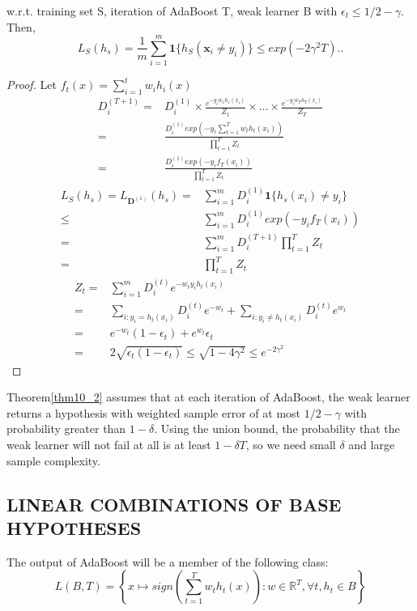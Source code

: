 \begin{thm}
	\label{thm10_2}
	w.r.t. training set S, iteration of AdaBoost T, weak learner B with $\epsilon_t \le 1/2 - \gamma$. Then,
	\[
		L_S(h_s) = \frac{1}{m} \sum\limits^m_{i=1}
		\mathbf{1} \{ h_S(\mathbf{x}_i \ne y_i) \}
		\le exp(-2 \gamma^2 T).
	.\]
\end{thm}
\begin{proof}
	Let $f_t(x) = \sum\limits^t_{i=1} w_i h_i (x)$
	\begin{align*}
		D^{(T+1)}_{i} =& D^{(1)}_{i} \times \frac{e^{-y_i w_1 h_1(x_i)}}{Z_1}
		\times \dots \times \frac{e^{-y_i w_T h_T(x_i)}}{Z_T} \\
		=& \frac{D^{(1)}_{i}exp(-y_i \sum^T_{t=1}w_t h_t(x_i))}{\prod^T_{t=1} Z_t} \\
		=& \frac{D^{(1)}_{i}exp(-y_if_T(x_i))}{\prod^T_{t=1}Z_t}
	\end{align*}
	\begin{align*}
		L_S(h_s) = L_{\textbf{D}^{(1)}}(h_s)
		=& \sum\limits^m_{i=1}D^{(1)}_{i} \textbf{1} \{ h_s(x_i) \ne y_i \} \\
		\le& \sum\limits^m_{i=1} D^{(1)}_i exp(-y_i f_T(x_i)) \\
		=& \sum\limits^m_{i=1}D^{(T+1)}_i \prod\limits^T_{t=1} Z_t \\
		=& \prod\limits^T_{t=1} Z_t
	\end{align*}
	\begin{align*}
		Z_t =& \sum\limits^m_{i=1} D^{(t)}_i e^{-w_t y_i h_t(x_i)} \\
		=& \sum\limits_{i:y_i = h_t(x_i)} D^{(t)}_i e^{-w_t}
		+ \sum\limits_{i:y_i \ne h_t(x_i)} D^{(t)}_i e^{w_t} \\
		=& e^{-w_t}(1-\epsilon_t) + e^{w_t}\epsilon_t \\
		=& 2\sqrt{\epsilon_t(1-\epsilon_t)} \le \sqrt{1-4\gamma^2} \le e^{-2\gamma^2}
	\end{align*}
\end{proof}
Theorem\ref{thm10_2} assumes that at each iteration of AdaBoost, the weak learner returns
a hypothesis with weighted sample error of at most $1/2-\gamma$ with probability greater
than $1-\delta$. Using the union bound, the probability that the weak learner will not fail at all
is at least $1-\delta T$, so we need small $\delta$ and large sample complexity.

\subsection{LINEAR COMBINATIONS OF BASE HYPOTHESES}
The output of AdaBoost will be a member of the following class:
\begin{equation}
	\label{equ10_4}
	 L(B,T) = \left\{ x \mapsto sign \left( \sum^T_{t=1}w_th_t(x) \right) : 
	 w \in \mathbb{R}^T, \forall t, h_t \in B \right\}
\end{equation}

